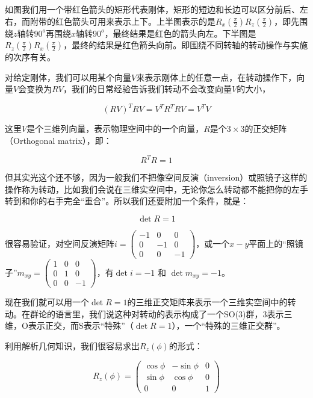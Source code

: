 如图我们用一个带红色箭头的矩形代表刚体，矩形的短边和长边可以区分前后、左右，而附带的红色箭头可用来表示上下。上半图表示的是$R_x(\frac{\pi}{2})R_z(\frac{\pi}{2})$，即先围绕$z$轴转$90^o$再围绕$x$轴转$90^o$，最终结果是红色的箭头向左。下半图是$R_z(\frac{\pi}{2})R_x(\frac{\pi}{2})$，最终的结果是红色箭头向前。即围绕不同转轴的转动操作与实施的次序有关。

对给定刚体，我们可以用某个向量$V$来表示刚体上的任意一点，在转动操作下，向量$V$会变换为$R V$，我们的日常经验告诉我们转动不会改变向量$V$的大小，

\begin{equation}
\left( R V \right)^T RV = V^T R^T R V = V^T V 
\end{equation}

这里$V$是个三维列向量，表示物理空间中的一个向量，$R$是个$3 \times 3$的正交矩阵（Orthogonal matrix），即：

\begin{equation}
R^T R = 1
\end{equation}

但其实光这个还不够，因为一般我们不把像空间反演（inversion）或照镜子这样的操作称为转动，比如我们会说在三维实空间中，无论你怎么转动都不能把你的左手转到和你的右手完全“重合”。所以我们还要附加一个条件，就是：

\begin{equation}
\det R = 1
\end{equation}

很容易验证，对空间反演矩阵$i = \left( \begin{array}{ccc} -1 & 0 & 0 \\ 0 & -1 & 0 \\ 0 & 0 & -1 \end{array} \right)$，或一个$x-y$平面上的“照镜子”$ m_{xy} = \left( \begin{array}{ccc} 1 & 0 & 0 \\ 0 & 1 & 0 \\ 0 & 0 & -1 \end{array} \right) $，有$\det i = -1$ 和 $ \det m_{xy} = -1$。

现在我们就可以用一个$\det R = 1$的三维正交矩阵来表示一个三维实空间中的转动。在群论的语言里，我们说这种对转动的表示构成了一个SO(3)群，3表示三维，O表示正交，而S表示“特殊”（$\det R = 1$），一个“特殊的三维正交群”。

利用解析几何知识，我们很容易求出$R_z(\phi)$的形式：

\begin{equation}
R_z (\phi) = \left( \begin{array}{ccc} \cos \phi & - \sin \phi & 0 \\ \sin \phi & \cos \phi & 0 \\ 0 & 0 & 1 \end{array} \right)
\end{equation}


